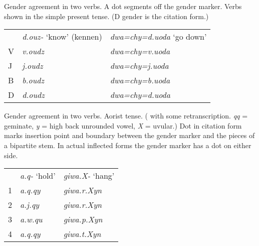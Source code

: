\documentclass[output=collectionpaper]{langsci/langscibook}
\begin{document}
\ea
\label{ex:Nich:7}
Gender agreement in two  verbs. A dot segments off the gender marker. Verbs shown in the simple present tense. (D gender is the citation form.)\\
\medskip
\begin{tabular}{p{0.5cm}p{4cm}p{5cm}}
	 &	{\itshape d.ouz-} `know' (kennen) &	{\itshape dwa=chy=d.uoda} `go down' \\
	V &	\itshape v.oudz &				\itshape dwa=chy=v.uoda \\
	J &	\itshape  j.oudz &				\itshape dwa=chy=j.uoda \\
	B &	\itshape b.oudz &				\itshape dwa=chy=b.uoda \\
	D &	\itshape d.oudz &				\itshape dwa=chy=d.uoda \\
\end{tabular}
\z

\ea
\label{ex:Nich:8}
Gender agreement in two  verbs. Aorist tense. (\citealt[85]{Dobrushina1999} with some retranscription. \textit{qq} = geminate, \textit{y} = high back unrounded vowel, \textit{X} = uvular.) Dot in citation form marks insertion point and boundary between the gender marker and the pieces of a bipartite stem. In actual inflected forms the gender marker has a dot on either side. \\
\medskip
\begin{tabular}{p{0.5cm}p{4cm}p{5cm}}
	 &	{\itshape a.q-} `hold'	 &	{\itshape giwa.X-} `hang' \\
	1 &	\itshape a.q.qy &			\itshape 	giwa.r.Xyn \\
	2 &	\itshape  a.j.qy &			\itshape 	giwa.r.Xyn \\
	3 &	\itshape a.w.qu &			\itshape 	giwa.p.Xyn \\
	4 &	\itshape a.q.qy	 &			\itshape 	giwa.t.Xyn \\
\end{tabular}
\z
\end{document}
